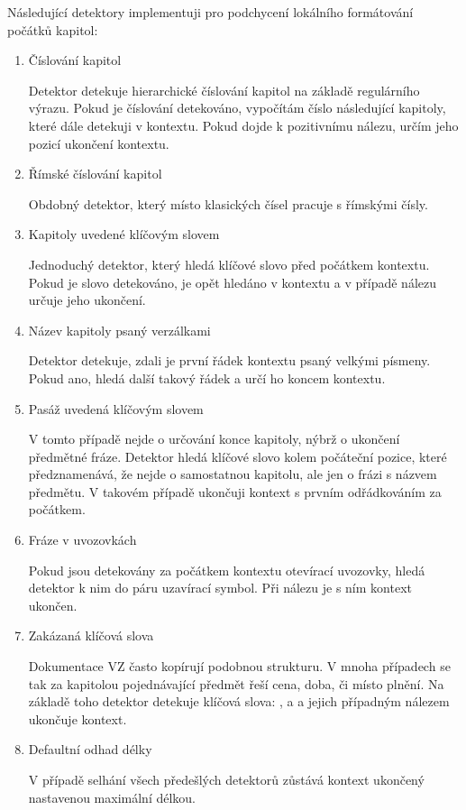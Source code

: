 \documentclass[thesis=M,czech]{FITthesis}[2019/12/23]
\begin{document}
Následující detektory implementuji pro podchycení lokálního formátování počátků kapitol:
\begin{enumerate}
    \item Číslování kapitol
    
    Detektor detekuje hierarchické číslování kapitol na základě regulárního výrazu. Pokud je číslování detekováno, vypočítám číslo následující kapitoly, které dále detekuji v kontextu. Pokud dojde k pozitivnímu nálezu, určím jeho pozicí ukončení kontextu.
    
    \item Římské číslování kapitol

    Obdobný detektor, který místo klasických čísel pracuje s římskými čísly.

    \item Kapitoly uvedené klíčovým slovem
    
    Jednoduchý detektor, který hledá klíčové slovo  před počátkem kontextu. Pokud je slovo detekováno, je opět hledáno v kontextu a v případě nálezu určuje jeho ukončení.
    
    \item Název kapitoly psaný verzálkami
    
    Detektor detekuje, zdali je první řádek kontextu psaný velkými písmeny. Pokud ano, hledá další takový řádek a určí ho koncem kontextu.
    
    \item Pasáž uvedená klíčovým slovem
    
    V tomto případě nejde o určování konce kapitoly, nýbrž o ukončení předmětné fráze. Detektor hledá klíčové slovo  kolem počáteční pozice, které předznamenává, že nejde o samostatnou kapitolu, ale jen o frázi s názvem předmětu. V takovém případě  ukončuji kontext s prvním odřádkováním za počátkem.
    
    \item Fráze v uvozovkách
    
    Pokud jsou detekovány za počátkem kontextu otevírací uvozovky, hledá detektor k nim do páru uzavírací symbol. Při nálezu je s ním kontext ukončen.
    
    \item Zakázaná klíčová slova
    
    Dokumentace VZ často kopírují podobnou strukturu. V mnoha případech se tak za kapitolou pojednávající předmět řeší cena, doba, či místo plnění. Na základě toho detektor detekuje klíčová slova: ,  a  a jejich případným nálezem ukončuje kontext.
    
    \item Defaultní odhad délky
    
    V případě selhání všech předešlých detektorů zůstává kontext ukončený nastavenou maximální délkou.
    
\end{enumerate}
\end{document}
